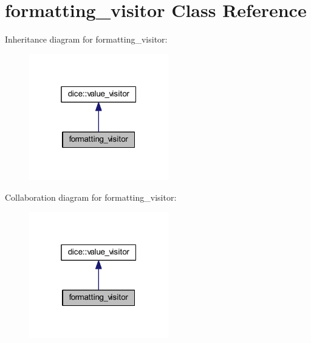 \hypertarget{classformatting__visitor}{}\section{formatting\+\_\+visitor Class Reference}
\label{classformatting__visitor}


Inheritance diagram for formatting\+\_\+visitor\+:\nopagebreak
\begin{figure}[H]
\begin{center}
\leavevmode
\includegraphics[width=172pt]{classformatting__visitor__inherit__graph}
\end{center}
\end{figure}


Collaboration diagram for formatting\+\_\+visitor\+:\nopagebreak
\begin{figure}[H]
\begin{center}
\leavevmode
\includegraphics[width=172pt]{classformatting__visitor__coll__graph}
\end{center}
\end{figure}
